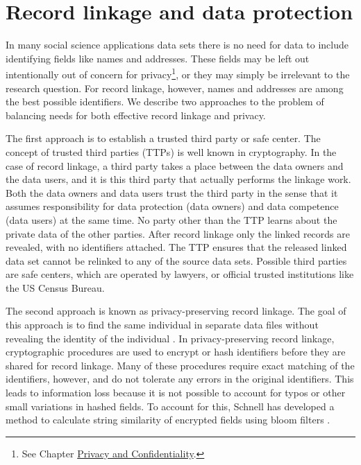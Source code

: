 \documentclass[]{krantz}
\begin{document}
\section{Record linkage and data
protection}\label{record-linkage-and-data-protection}

In many social science applications data sets there is no need for data
to include identifying fields like names and addresses. These fields may
be left out intentionally out of concern for privacy\footnote{See
  Chapter \protect\hyperlink{chap:privacy}{Privacy and Confidentiality}.},
or they may simply be irrelevant to the research question. For record
linkage, however, names and addresses are among the best possible
identifiers. We describe two approaches to the problem of balancing
needs for both effective record linkage and privacy.

The first approach is to establish a trusted third party or safe center.
The concept of trusted third parties (TTPs) is well known in
cryptography. In the case of record linkage, a third party takes a place
between the data owners and the data users, and it is this third party
that actually performs the linkage work. Both the data owners and data
users trust the third party in the sense that it assumes responsibility
for data protection (data owners) and data competence (data users) at
the same time. No party other than the TTP learns about the private data
of the other parties. After record linkage only the linked records are
revealed, with no identifiers attached. The TTP ensures that the
released linked data set cannot be relinked to any of the source data
sets. Possible third parties are safe centers, which are operated by
lawyers, or official trusted institutions like the US Census Bureau.

The second approach is known as privacy-preserving record linkage. The
goal of this approach is to find the same individual in separate data
files without revealing the identity of the individual
\citep{Clifton06}. In privacy-preserving record linkage, cryptographic
procedures are used to encrypt or hash identifiers before they are
shared for record linkage. Many of these procedures require exact
matching of the identifiers, however, and do not tolerate any errors in
the original identifiers. This leads to information loss because it is
not possible to account for typos or other small variations in hashed
fields. To account for this, Schnell has developed a method to calculate
string similarity of encrypted fields using bloom filters
\citep{schnell2014efficient, schnell2009privacy}.
\end{document}
